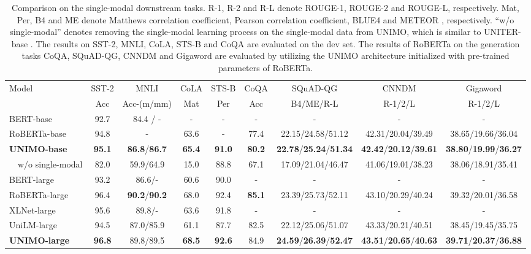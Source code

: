 \documentclass[11pt,a4paper]{article}
\begin{document}
\begin{table*}[ht!]
 \centering
 \setlength{\tabcolsep}{2.7pt}
 \small
 \begin{tabular}{l c c c c c c c c}
  \hline \hline
  \multirow{2}{*}{Model} & SST-2 & MNLI & CoLA & STS-B & CoQA & SQuAD-QG & CNNDM & Gigaword\\
& Acc & Acc-(m/mm)& Mat & Per & Acc & B4/ME/R-L & R-1/2/L & R-1/2/L \\
  \hline
BERT-base & 92.7 & 84.4 / - & - & -  & - & - & - & - \\
  RoBERTa-base & 94.8 & - & 63.6 & - & 77.4 & 22.15/24.58/51.12 & 42.31/20.04/39.49 & 38.65/19.66/36.04\\
\textbf{UNIMO-base} & \textbf{95.1}&\textbf{86.8}/\textbf{86.7} & \textbf{65.4} & \textbf{91.0} & \textbf{80.2} & \textbf{22.78}/\textbf{25.24}/\textbf{51.34} & \textbf{42.42}/\textbf{20.12}/\textbf{39.61} & \textbf{38.80}/\textbf{19.99}/\textbf{36.27} \\
  \ \ w/o single-modal & 82.0 & 59.9/64.9 & 15.0 & 88.8 & 67.1 & 17.09/21.04/46.47 & 41.06/19.01/38.23 & 38.06/18.91/35.41 \\
  \hline
  BERT-large & 93.2 & 86.6/- & 60.6 & 90.0 & - & - & - & - \\
  RoBERTa-large & 96.4 & \textbf{90.2}/\textbf{90.2} & 68.0 & 92.4 & \textbf{85.1} & 23.39/25.73/52.11  & 43.10/20.29/40.24 & 39.32/20.01/36.58 \\
  XLNet-large & 95.6 & 89.8/- & 63.6 & 91.8 & - & - & - & -\\
  UniLM-large & 94.5 & 87.0/85.9 &  61.1 & 87.7 & 82.5 & 22.12/25.06/51.07 & 43.33/20.21/40.51 & 38.45/19.45/35.75 \\
  \textbf{UNIMO-large} & \textbf{96.8} & 89.8/89.5 & \textbf{68.5} & \textbf{92.6} & 84.9 & \textbf{24.59}/\textbf{26.39}/\textbf{52.47}  & \textbf{43.51}/\textbf{20.65}/\textbf{40.63} & \textbf{39.71}/\textbf{20.37}/\textbf{36.88}\\
  \hline
   \hline
 \end{tabular}
 \caption{\label{single-modal}
Comparison on the single-modal downstream tasks. R-1, R-2 and R-L denote ROUGE-1, ROUGE-2 and ROUGE-L, respectively. Mat, Per, B4 and ME denote Matthews correlation coefficient, Pearson correlation coefficient, BLUE4 and METEOR \citep{lavie2007meteor}, respectively. ``w/o single-modal'' denotes removing the single-modal learning process on the single-modal data from UNIMO, which is similar to UNITER-base \citep{chen2020uniter}. The results on SST-2, MNLI, CoLA, STS-B and CoQA are evaluated on the dev set. The results of RoBERTa on the generation tasks CoQA, SQuAD-QG, CNNDM and Gigaword are evaluated by utilizing the UNIMO architecture initialized with pre-trained parameters of RoBERTa.
 }
\end{table*}
\end{document}
